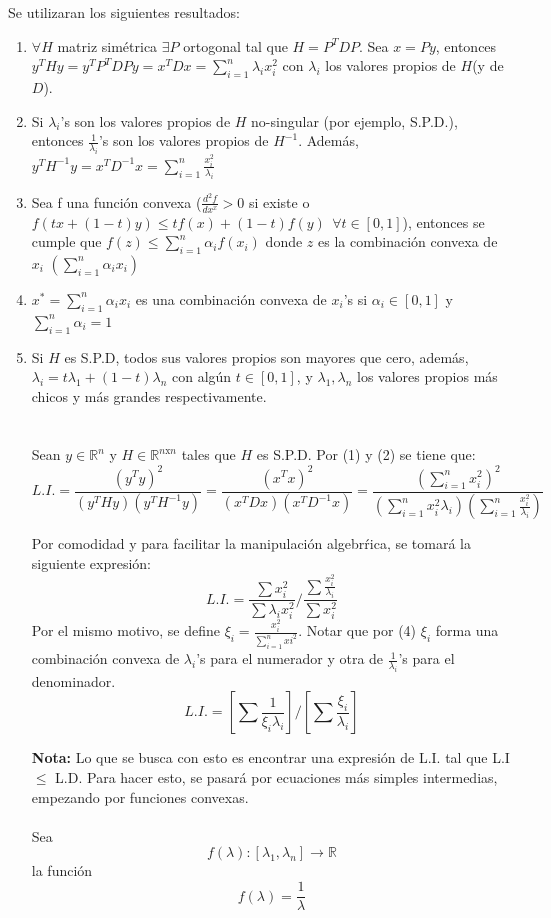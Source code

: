 \documentclass[12pt]{article}
\begin{document}
	\noindent Se utilizaran los siguientes resultados:
	\begin{enumerate}
	\item $\forall H$ matriz sim\'etrica $\exists P$  ortogonal tal que $H = P^TDP$. Sea $x=Py$, entonces $y^THy = y^TP^TDPy = x^TDx = \sum_{i=1}^n \lambda_i x_i^2$ con $\lambda_i$ los valores propios de $H$(y de $D$).\
	\item Si $\lambda_i$'s son los valores propios de $H$ no-singular (por ejemplo, S.P.D.), entonces $\frac{1}{\lambda_i}$'s son los valores propios de $H^{-1}$. Adem\'as, $y^TH^{-1}y = x^TD^{-1}x = \sum_{i=1}^n \frac{x_i^2}{\lambda_i}$\
	\item Sea f una funci\'on convexa ($\frac{d^2 f}{d x^x} > 0 $ si existe o $f(tx + (1-t)y) \le t f(x) + (1-t)f(y) \ \ \forall t \in \left[0,1\right]$), entonces se cumple que $f(z) \le \sum_{i=1}^n \alpha_i f(x_i)$ donde $z$ es la combinaci\'on convexa de $x_i$ $(\sum_{i=1}^n \alpha_i x_i)$ \
	\item $x^* = \sum_{i=1}^n \alpha_i x_i$ es una combinaci\'on convexa de $x_i$'s si $\alpha_i \in \left[0,1\right]$ y $\sum_{i=1}^n \alpha_i = 1$ \
	\item Si $H$ es S.P.D, todos sus valores propios son mayores que cero, adem\'as, $\lambda_i = t\lambda_1 + (1-t)\lambda_n$ con alg\'un $t \in \left[0,1\right]$, y $\lambda_1, \lambda_n$ los valores propios m\'as chicos y m\'as grandes respectivamente. \\ \\ \\
	
	\noindent Sean $y \in \mathbb{R}^n$ y $H \in \mathbb{R}^{n\text{x}n}$ tales que $H$ es S.P.D. Por (1) y (2) se tiene que: $$L.I. = \frac{(y^Ty)^2}{(y^THy)(y^TH^{-1}y)} = \frac{(x^Tx)^2}{(x^TDx)(x^TD^{-1}x)} = \frac{(\sum_{i=1}^n x_i^2)^2}{(\sum_{i=1}^n x_i^2 \lambda_i )(\sum_{i=1}^n\frac{x_i^2}{\lambda_i})}$$
	
	\noindent Por comodidad y para facilitar la manipulaci\'on algebr\'rica, se tomar\'a la siguiente expresi\'on: $$L.I. = {\frac{\sum x_i^2}{\sum \lambda_i x_i^2}}/{\frac{\sum \frac{x_i^2}{\lambda_i}}{\sum x_i^2}}$$
	\noindent Por el mismo motivo, se define $ \xi_{i} = \frac{x_{i}^{2}}{\sum_{i=1}^{n}x{i}^{2}}$. Notar que por (4) $\xi_i$ forma una combinaci\'on convexa de $\lambda_i$'s para el numerador y otra de $\frac{1}{\lambda_i}$'s para el denominador. $$L.I. = \left[\sum \frac{1}{\xi_i \lambda_i}\right]/\left[\sum \frac{\xi_i}{\lambda_i}\right]$$ 
	
	{\bf Nota:} Lo que se busca con esto es encontrar una expresi\'on de L.I. tal que L.I $\le$ L.D. Para hacer esto, se pasar\'a por ecuaciones m\'as simples intermedias, empezando por funciones convexas. \\ \\
	 \noindent Sea $$f(\lambda): \left[\lambda_1, \lambda_n\right] \longrightarrow \mathbb{R}$$ la funci\'on $$f(\lambda) = \frac{1}{\lambda}$$
	 

\end{enumerate}
\end{document}
